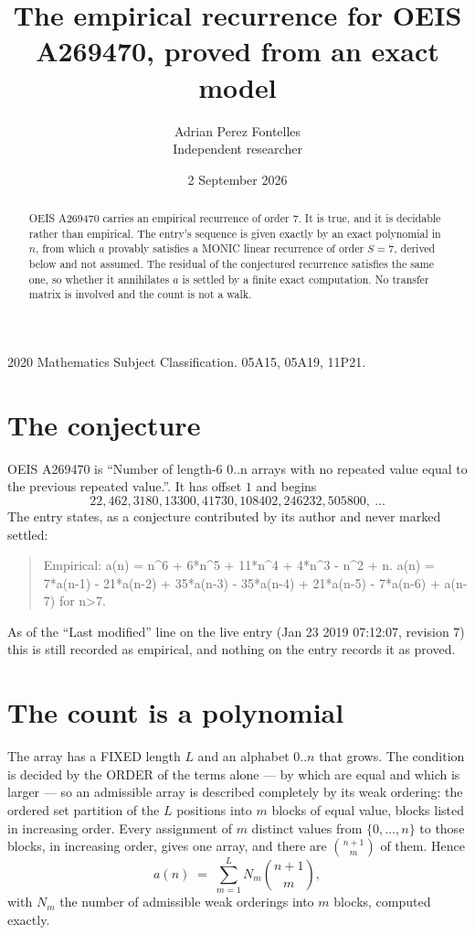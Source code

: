\documentclass[11pt,a4paper]{article}
\title{The empirical recurrence for OEIS A269470, proved from an exact model}
\author{Adrian Perez Fontelles\\ \small Independent researcher}
\date{2 September 2026}
\theoremstyle{plain}
\theoremstyle{definition}
\begin{document}
\maketitle

\begin{abstract}
OEIS A269470 carries an empirical recurrence of order $7$. It is true, and it is
decidable rather than empirical. The entry's sequence is given exactly by an exact polynomial in $n$, from
which $a$ provably satisfies a MONIC linear recurrence of order $S=7$, derived below and not
assumed. The residual of the conjectured recurrence satisfies the same one, so whether it
annihilates $a$ is settled by a finite exact computation. No transfer matrix is involved and
the count is not a walk.
\end{abstract}

\noindent\small 2020 Mathematics Subject Classification. 05A15, 05A19, 11P21.\normalsize

\section{The conjecture}

OEIS A269470 is ``Number of length-6 0..n arrays with no repeated value equal to the previous repeated value.''. It has offset $1$ and begins
\[
22, 462, 3180, 13300, 41730, 108402, 246232, 505800,\ \dots
\]
The entry states, as a conjecture contributed by its author and never marked settled:
\begin{quote}
Empirical: a(n) = n\^{}6 + 6*n\^{}5 + 11*n\^{}4 + 4*n\^{}3 - n\^{}2 + n. a(n) = 7*a(n-1) - 21*a(n-2) + 35*a(n-3) - 35*a(n-4) + 21*a(n-5) - 7*a(n-6) + a(n-7) for n>7.
\end{quote}
As of the ``Last modified'' line on the live entry (Jan 23 2019 07:12:07, revision 7)
this is still recorded as empirical, and nothing on the entry records it as proved.

\section{The count is a polynomial}

The array has a FIXED length $L$ and an alphabet $0..n$ that grows. The condition is decided by
the ORDER of the terms alone --- by which are equal and which is larger --- so an admissible
array is described completely by its weak ordering: the ordered set partition of the $L$
positions into $m$ blocks of equal value, blocks listed in increasing order. Every assignment
of $m$ distinct values from $\{0,\dots,n\}$ to those blocks, in increasing order, gives one
array, and there are $\binom{n+1}{m}$ of them. Hence
\[
a(n)\;=\;\sum_{m=1}^{L} N_m\binom{n+1}{m},
\]
with $N_m$ the number of admissible weak orderings into $m$ blocks, computed exactly.
\end{document}
